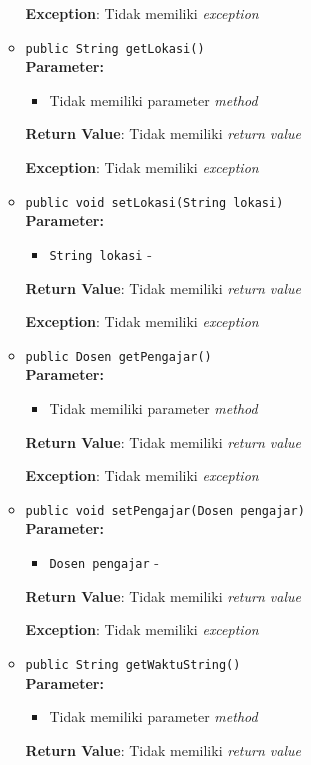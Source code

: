 \documentclass{article}
\begin{document}
\begin{enumerate}
\begin{itemize}
\textbf{Exception}: Tidak memiliki \textit{exception}

\item \texttt{public String getLokasi()}\\ 


\textbf{Parameter:}\begin{itemize}
\item Tidak memiliki parameter \textit{method}
\end{itemize}
\textbf{Return Value}: Tidak memiliki \textit{return value}

\textbf{Exception}: Tidak memiliki \textit{exception}

\item \texttt{public void setLokasi(String lokasi)}\\ 


\textbf{Parameter:}\begin{itemize}
\item \texttt{String lokasi} - 
\end{itemize}
\textbf{Return Value}: Tidak memiliki \textit{return value}

\textbf{Exception}: Tidak memiliki \textit{exception}

\item \texttt{public Dosen getPengajar()}\\ 


\textbf{Parameter:}\begin{itemize}
\item Tidak memiliki parameter \textit{method}
\end{itemize}
\textbf{Return Value}: Tidak memiliki \textit{return value}

\textbf{Exception}: Tidak memiliki \textit{exception}

\item \texttt{public void setPengajar(Dosen pengajar)}\\ 


\textbf{Parameter:}\begin{itemize}
\item \texttt{Dosen pengajar} - 
\end{itemize}
\textbf{Return Value}: Tidak memiliki \textit{return value}

\textbf{Exception}: Tidak memiliki \textit{exception}

\item \texttt{public String getWaktuString()}\\ 


\textbf{Parameter:}\begin{itemize}
\item Tidak memiliki parameter \textit{method}
\end{itemize}
\textbf{Return Value}: Tidak memiliki \textit{return value}


\end{itemize}
\end{enumerate}
\end{document}
